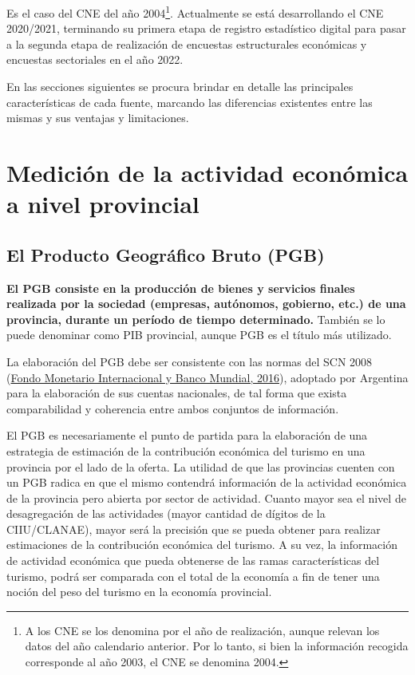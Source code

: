 \documentclass[
  openany]{book}
\begin{document}
\begin{itemize}
  Es el caso del CNE del año 2004\footnote{A los CNE se los denomina por el año de realización, aunque relevan los datos del año calendario anterior. Por lo tanto, si bien la información recogida corresponde al año 2003, el CNE se denomina 2004.}.
  Actualmente se está desarrollando el CNE 2020/2021, terminando su primera etapa de registro estadístico digital para pasar a la segunda etapa de realización de encuestas estructurales económicas y encuestas sectoriales en el año 2022.
\end{itemize}

En las secciones siguientes se procura brindar en detalle las principales características de cada fuente, marcando las diferencias existentes entre las mismas y sus ventajas y limitaciones.

\hypertarget{mediciuxf3n-de-la-actividad-econuxf3mica-a-nivel-provincial}{%
\section{Medición de la actividad económica a nivel provincial}\label{mediciuxf3n-de-la-actividad-econuxf3mica-a-nivel-provincial}}

\hypertarget{el-producto-geogruxe1fico-bruto-pgb}{%
\subsection{El Producto Geográfico Bruto (PGB)}\label{el-producto-geogruxe1fico-bruto-pgb}}

\textbf{El PGB consiste en la producción de bienes y servicios finales realizada por la sociedad (empresas, autónomos, gobierno, etc.) de una provincia, durante un período de tiempo determinado.} También se lo puede denominar como PIB provincial, aunque PGB es el título más utilizado.

La elaboración del PGB debe ser consistente con las normas del SCN 2008 (\protect\hyperlink{ref-scn2008}{Fondo Monetario Internacional y Banco Mundial, 2016}), adoptado por Argentina para la elaboración de sus cuentas nacionales, de tal forma que exista comparabilidad y coherencia entre ambos conjuntos de información.

El PGB es necesariamente el punto de partida para la elaboración de una estrategia de estimación de la contribución económica del turismo en una provincia por el lado de la oferta. La utilidad de que las provincias cuenten con un PGB radica en que el mismo contendrá información de la actividad económica de la provincia pero abierta por sector de actividad. Cuanto mayor sea el nivel de desagregación de las actividades (mayor cantidad de dígitos de la CIIU/CLANAE), mayor será la precisión que se pueda obtener para realizar estimaciones de la contribución económica del turismo. A su vez, la información de actividad económica que pueda obtenerse de las ramas características del turismo, podrá ser comparada con el total de la economía a fin de tener una noción del peso del turismo en la economía provincial.
\end{document}
